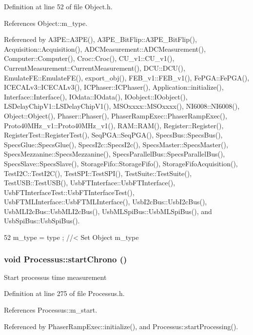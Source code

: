 Definition at line 52 of file Object.h.

References Object::m\_\-type.

Referenced by A3PE::A3PE(), A3PE\_\-BitFlip::A3PE\_\-BitFlip(), Acquisition::Acquisition(), ADCMeasurement::ADCMeasurement(), Computer::Computer(), Croc::Croc(), CU\_\-v1::CU\_\-v1(), CurrentMeasurement::CurrentMeasurement(), DCU::DCU(), EmulateFE::EmulateFE(), export\_\-obj(), FEB\_\-v1::FEB\_\-v1(), FePGA::FePGA(), ICECALv3::ICECALv3(), ICPhaser::ICPhaser(), Application::initialize(), Interface::Interface(), IOdata::IOdata(), IOobject::IOobject(), LSDelayChipV1::LSDelayChipV1(), MSOxxxx::MSOxxxx(), NI6008::NI6008(), Object::Object(), Phaser::Phaser(), PhaserRampExec::PhaserRampExec(), Proto40MHz\_\-v1::Proto40MHz\_\-v1(), RAM::RAM(), Register::Register(), RegisterTest::RegisterTest(), SeqPGA::SeqPGA(), SpecsBus::SpecsBus(), SpecsGlue::SpecsGlue(), SpecsI2c::SpecsI2c(), SpecsMaster::SpecsMaster(), SpecsMezzanine::SpecsMezzanine(), SpecsParallelBus::SpecsParallelBus(), SpecsSlave::SpecsSlave(), StorageFifo::StorageFifo(), StorageFifoAcquisition(), TestI2C::TestI2C(), TestSPI::TestSPI(), TestSuite::TestSuite(), TestUSB::TestUSB(), UsbFTInterface::UsbFTInterface(), UsbFTInterfaceTest::UsbFTInterfaceTest(), UsbFTMLInterface::UsbFTMLInterface(), UsbI2cBus::UsbI2cBus(), UsbMLI2cBus::UsbMLI2cBus(), UsbMLSpiBus::UsbMLSpiBus(), and UsbSpiBus::UsbSpiBus().


\begin{DoxyCode}
52 { m_type  = type  ; } //< Set Object m_type
\end{DoxyCode}
\hypertarget{classProcessus_a5e4d34b86241fa0756e07375a14ff4b2}{
\subsubsection[{startChrono}]{\setlength{\rightskip}{0pt plus 5cm}void Processus::startChrono ()}}
\label{classProcessus_a5e4d34b86241fa0756e07375a14ff4b2}
Start processus time measurement 

Definition at line 275 of file Processus.h.

References Processus::m\_\-start.

Referenced by PhaserRampExec::initialize(), and Processus::startProcessing().


